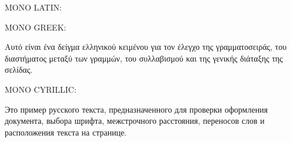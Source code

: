 \documentclass[border=1.5cm,varwidth=10cm]{standalone}
\begin{document}
\setlength{\parindent}{2em}

\noindent
{\ascii \scriptsize MONO LATIN:}

{\mono \lipsum[1][1-4]}

\vspace{.5cm}

\noindent
{\ascii \scriptsize MONO GREEK:}

{\mono Αυτό είναι ένα δείγμα ελληνικού κειμένου για τον έλεγχο της γραμματοσειράς, του διαστήματος μεταξύ των γραμμών, του συλλαβισμού και της γενικής διάταξης της σελίδας.}
\vspace{.5cm}

\noindent
{\ascii \scriptsize MONO CYRILLIC:}

{\mono Это пример русского текста, предназначенного для проверки оформления документа, выбора шрифта, межстрочного расстояния, переносов слов и расположения текста на странице.}
\end{document}
